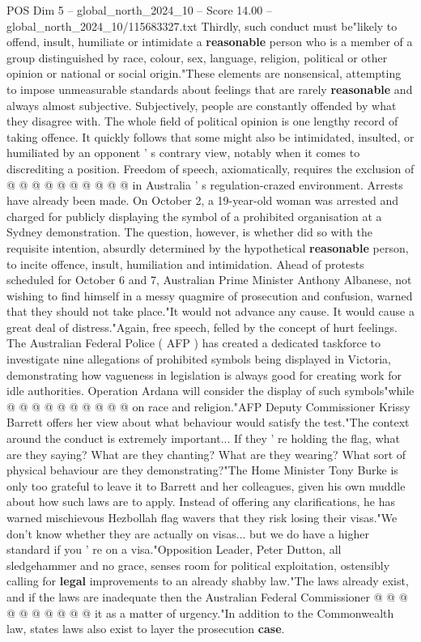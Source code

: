 \begin{textsample}{POS Dim 5 – global\_north\_2024\_10 – Score 14.00 – global\_north\_2024\_10/115683327.txt}
Thirdly, such conduct must be"likely to offend, insult, humiliate or intimidate a \textbf{reasonable} person who is a member of a group distinguished by race, colour, sex, language, religion, political or other opinion or national or social origin."These elements are nonsensical, attempting to impose unmeasurable standards about feelings that are rarely \textbf{reasonable} and always almost subjective.
Subjectively, people are constantly offended by what they disagree with.
The whole field of political opinion is one lengthy record of taking offence.
It quickly follows that some might also be intimidated, insulted, or humiliated by an opponent ' s contrary view, notably when it comes to discrediting a position.
Freedom of speech, axiomatically, requires the exclusion of @ @ @ @ @ @ @ @ @ @ in Australia ' s regulation-crazed environment.
Arrests have already been made.
On October 2, a 19-year-old woman was arrested and charged for publicly displaying the symbol of a prohibited organisation at a Sydney demonstration.
The question, however, is whether did so with the requisite intention, absurdly determined by the hypothetical \textbf{reasonable} person, to incite offence, insult, humiliation and intimidation.
Ahead of protests scheduled for October 6 and 7, Australian Prime Minister Anthony Albanese, not wishing to find himself in a messy quagmire of prosecution and confusion, warned that they should not take place."It would not advance any cause.
It would cause a great deal of distress."Again, free speech, felled by the concept of hurt feelings.
The Australian Federal Police ( AFP ) has created a dedicated taskforce to investigate nine allegations of prohibited symbols being displayed in Victoria, demonstrating how vagueness in legislation is always good for creating work for idle authorities.
Operation Ardana will consider the display of such symbols"while @ @ @ @ @ @ @ @ @ @ on race and religion."AFP Deputy Commissioner Krissy Barrett offers her view about what behaviour would satisfy the test."The context around the conduct is extremely important...
If they ' re holding the flag, what are they saying?
What are they chanting?
What are they wearing?
What sort of physical behaviour are they demonstrating?"The Home Minister Tony Burke is only too grateful to leave it to Barrett and her colleagues, given his own muddle about how such laws are to apply.
Instead of offering any clarifications, he has warned mischievous Hezbollah flag wavers that they risk losing their visas."We don't know whether they are actually on visas... but we do have a higher standard if you ' re on a visa."Opposition Leader, Peter Dutton, all sledgehammer and no grace, senses room for political exploitation, ostensibly calling for \textbf{legal} improvements to an already shabby law."The laws already exist, and if the laws are inadequate then the Australian Federal Commissioner @ @ @ @ @ @ @ @ @ @ it as a matter of urgency."In addition to the Commonwealth law, states laws also exist to layer the prosecution \textbf{case}.

\end{textsample}
